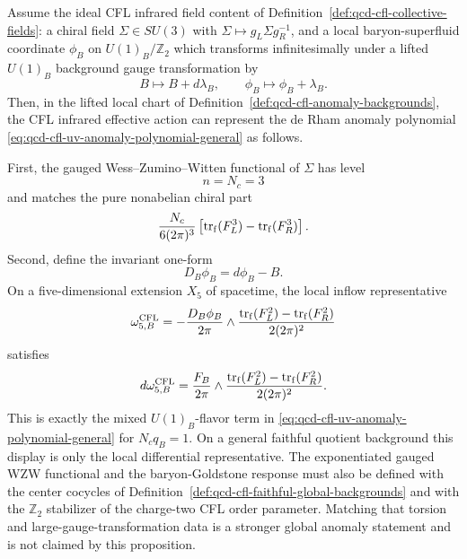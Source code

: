 \begin{proposition}
\label{prop:qcd-cfl-continuous-anomaly-matching}
Assume the ideal CFL infrared field content of
Definition~\ref{def:qcd-cfl-collective-fields}: a chiral field
\(\Sigma\in SU(3)\) with
\(\Sigma\mapsto g_L\Sigma g_R^{-1}\), and a local baryon-superfluid coordinate
\(\phi_B\) on \(U(1)_B/\mathbb Z_2\) which transforms infinitesimally under a
lifted \(U(1)_B\) background gauge transformation by
\begin{equation}
  B\mapsto B+d\lambda_B,
  \qquad
  \phi_B\mapsto\phi_B+\lambda_B .
  \label{eq:qcd-cfl-baryon-background-gauge-transformation}
\end{equation}
Then, in the lifted local chart of
Definition~\ref{def:qcd-cfl-anomaly-backgrounds}, the CFL infrared effective
action can represent the de Rham anomaly polynomial
\eqref{eq:qcd-cfl-uv-anomaly-polynomial-general} as follows.

First, the gauged Wess--Zumino--Witten functional of \(\Sigma\) has level
\begin{equation}
  n=N_c=3
  \label{eq:qcd-cfl-wzw-level}
\end{equation}
and matches the pure nonabelian chiral part
\begin{equation}
  \frac{N_c}{6(2\pi)^3}
  \left[
    \operatorname{tr}_{\rm f}(F_L^3)
    -
    \operatorname{tr}_{\rm f}(F_R^3)
  \right].
  \label{eq:qcd-cfl-pure-chiral-anomaly-piece}
\end{equation}
Second, define the invariant one-form
\begin{equation}
  D_B\phi_B=d\phi_B-B .
  \label{eq:qcd-cfl-baryon-goldstone-covariant-one-form}
\end{equation}
On a five-dimensional extension \(X_5\) of spacetime, the local inflow
representative
\begin{equation}
  \omega_{5,B}^{\rm CFL}
  =
  -
  \frac{D_B\phi_B}{2\pi}
  \wedge
  \frac{
    \operatorname{tr}_{\rm f}(F_L^2)
    -
    \operatorname{tr}_{\rm f}(F_R^2)
  }{2(2\pi)^2}
  \label{eq:qcd-cfl-baryon-mixed-anomaly-representative}
\end{equation}
satisfies
\begin{equation}
  d\omega_{5,B}^{\rm CFL}
  =
  \frac{F_B}{2\pi}
  \wedge
  \frac{
    \operatorname{tr}_{\rm f}(F_L^2)
    -
    \operatorname{tr}_{\rm f}(F_R^2)
  }{2(2\pi)^2}.
  \label{eq:qcd-cfl-baryon-mixed-anomaly-derivative}
\end{equation}
This is exactly the mixed \(U(1)_B\)-flavor term in
\eqref{eq:qcd-cfl-uv-anomaly-polynomial-general} for \(N_cq_B=1\).
On a general faithful quotient background this display is only the local
differential representative.  The exponentiated gauged WZW functional and the
baryon-Goldstone response must also be defined with the center cocycles of
Definition~\ref{def:qcd-cfl-faithful-global-backgrounds} and with the
\(\mathbb Z_2\) stabilizer of the charge-two CFL order parameter.  Matching
that torsion and large-gauge-transformation data is a stronger global anomaly
statement and is not claimed by this proposition.
\end{proposition}

